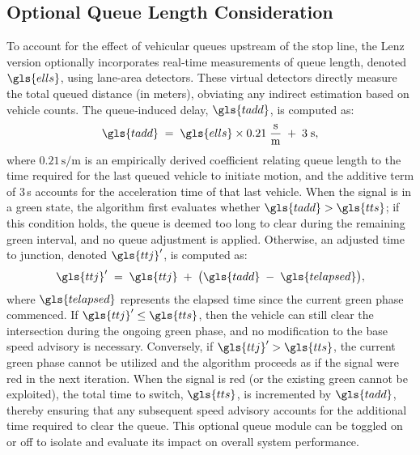 \subsection{Optional Queue Length Consideration}
\label{sec:Glosa_Queue_Length}

To account for the effect of vehicular queues upstream of the stop line, the Lenz version optionally incorporates real‐time measurements of queue length, denoted $\gls{ells}$, using lane‐area detectors. These virtual detectors directly measure the total queued distance (in meters), obviating any indirect estimation based on vehicle counts. The queue‐induced delay, $\gls{tadd}$, is computed as:
\begin{equation}
\gls{tadd} \;=\; \gls{ells} \times 0.21\;\frac{\text{s}}{\text{m}} \;+\; 3\;\text{s},
\end{equation}
where \(0.21\,\text{s/m}\) is an empirically derived coefficient relating queue length to the time required for the last queued vehicle to initiate motion, and the additive term of \(3\)\,s accounts for the acceleration time of that last vehicle. When the signal is in a green state, the algorithm first evaluates whether $\gls{tadd} > \gls{tts}$; if this condition holds, the queue is deemed too long to clear during the remaining green interval, and no queue adjustment is applied. Otherwise, an adjusted time to junction, denoted $\gls{ttj}'$, is computed as:
\begin{equation}
\gls{ttj}' \;=\; \gls{ttj} \;+\; \bigl(\gls{tadd} \;-\; \gls{telapsed}\bigr),
\end{equation}
where $\gls{telapsed}$ represents the elapsed time since the current green phase commenced. If $\gls{ttj}' \leq \gls{tts}$, then the vehicle can still clear the intersection during the ongoing green phase, and no modification to the base speed advisory is necessary. Conversely, if $\gls{ttj}' > \gls{tts}$, the current green phase cannot be utilized and the algorithm proceeds as if the signal were red in the next iteration. When the signal is red (or the existing green cannot be exploited), the total time to switch, $\gls{tts}$, is incremented by $\gls{tadd}$, thereby ensuring that any subsequent speed advisory accounts for the additional time required to clear the queue. This optional queue module can be toggled on or off to isolate and evaluate its impact on overall system performance.